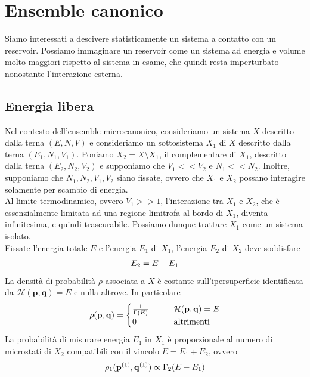 \documentclass{article}
\begin{document}
\newpage
\section{Ensemble canonico}
Siamo interessati a descivere statisticamente un sistema a contatto con un reservoir. Possiamo immaginare un reservoir come un sistema ad energia e volume molto maggiori rispetto al sistema in esame, che quindi resta imperturbato nonostante l'interazione esterna.

\subsection{Energia libera}
Nel contesto dell'ensemble microcanonico, consideriamo un sistema $X$ descritto dalla terna $(E, N, V)$ e consideriamo un sottosistema $X_1$ di $X$ descritto dalla terna $(E_1, N_1, V_1)$. Poniamo $X_2 = X \setminus X_1$, il complementare di $X_1$, descritto dalla terna $(E_2, N_2, V_2)$ e supponiamo che $V_1 << V_2$ e $N_1 << N_2$. Inoltre, supponiamo che $N_1, N_2, V_1, V_2$ siano fissate, ovvero che $X_1$ e $X_2$ possano interagire solamente per scambio di energia. \\
Al limite termodinamico, ovvero $V_1 >> 1$, l'interazione tra $X_1$ e $X_2$, che è essenzialmente limitata ad una regione limitrofa al bordo di $X_1$, diventa infinitesima, e quindi trascurabile. Possiamo dunque trattare $X_1$ come un sistema isolato. \\
Fissate l'energia totale $E$ e l'energia $E_1$ di $X_1$, l'energia $E_2$ di $X_2$ deve soddisfare 
\begin{align}
    E_2 = E - E_1 \notag
\end{align}
La densità di probabilità $\rho$ associata a $X$ è costante sull'ipersuperficie identificata da $\mathcal{H}(\mathbf{p}, \mathbf{q}) = E$ e nulla altrove. In particolare 
\begin{align}
    \rho(\mathbf{p}, \mathbf{q}) = \begin{cases}
        \frac{1}{\Gamma(E)} \qquad &\mathcal{H}(\mathbf{p}, \mathbf{q}) = E \\
        0 \qquad &\text{altrimenti}
    \end{cases} \notag
\end{align}
La probabilità di misurare energia $E_1$ in $X_1$ è proporzionale al numero di microstati di $X_2$ compatibili con il vincolo $E = E_1 + E_2$, ovvero 
\begin{align}
    \rho_1(\mathbf{p}^{(1)}, \mathbf{q}^{(1)}) \propto \Gamma_2(E - E_1) \notag
\end{align}
\end{document}
